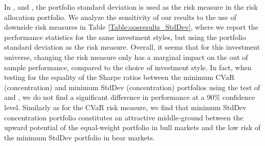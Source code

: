 \documentclass[12pt,a4paper]{article}
\begin{document}





In \citet{Maillard2010}, \citet{Qian2005} and \citet{Zhu2010}, the portfolio standard deviation is used as the risk measure in the risk allocation portfolio. We analyze the sensitivity of our results to the use of downside risk measures in Table \ref{Table:oosresults_StdDev}, where we report the performance statistics for the same investment styles, but using the portfolio standard deviation as the risk measure. Overall, it seems that for this investment universe,  changing the risk measure only has a marginal impact on the out of sample performance, compared to the choice of investment style. In fact, when testing for the equality of the Sharpe ratios between the minimum CVaR (concentration) and minimum StdDev (concentration) portfolios using the test of \citet{JobsonKorkie1981} and \citet{Memmel2003}, we do not find a significant difference in performance at a 90\% confidence level.  Similarly as for the CVaR risk measure, we find that minimum StdDev concentration portfolio constitutes an attractive middle-ground between the upward potential of the equal-weight portfolio in bull markets and the low risk of the minimum StdDev portfolio in bear markets.
\end{document}
